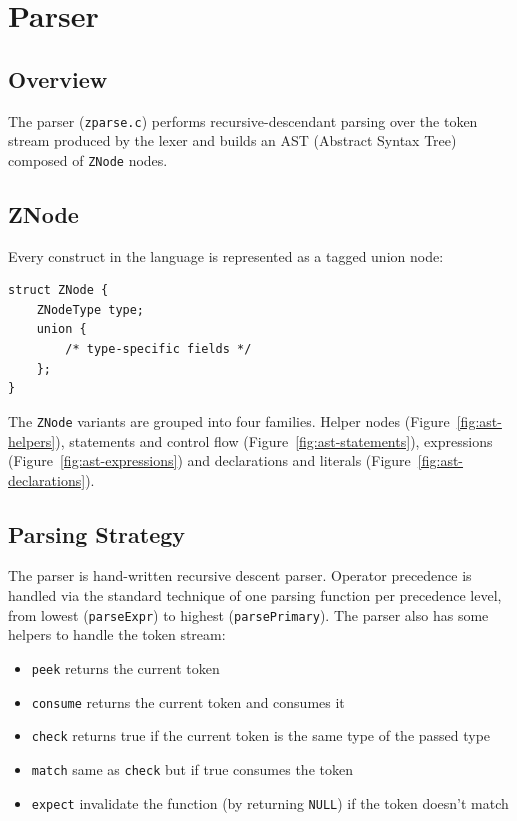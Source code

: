 \chapter{Parser}
\label{ch:parser}

\section{Overview}

The parser (\texttt{zparse.c}) performs recursive-descendant parsing over the token stream produced by the lexer and builds an AST (Abstract Syntax Tree) composed of \texttt{ZNode} nodes.

\section{ZNode}
Every construct in the language is represented as a tagged union node:
\begin{verbatim}
struct ZNode {
    ZNodeType type;
    union {
        /* type-specific fields */
    };
}
\end{verbatim}

The \texttt{ZNode} variants are grouped into four families. Helper nodes
(Figure~\ref{fig:ast-helpers}), statements and control flow
(Figure~\ref{fig:ast-statements}), expressions
(Figure~\ref{fig:ast-expressions}) and declarations and literals
(Figure~\ref{fig:ast-declarations}).





\section{Parsing Strategy}
The parser is hand-written recursive descent parser. Operator precedence is handled via the standard technique of one parsing function per precedence level, from lowest (\texttt{parseExpr}) to highest (\texttt{parsePrimary}).
The parser also has some helpers to handle the token stream:
\begin{itemize}
    \item{\texttt{peek}} returns the current token
    \item{\texttt{consume}} returns the current token and consumes it
    \item{\texttt{check}} returns true if the current token is the same type of the passed type
    \item{\texttt{match}} same as \texttt{check} but if true consumes the token
    \item{\texttt{expect}} invalidate the function (by returning \texttt{NULL}) if the token doesn't match
\end{itemize}

